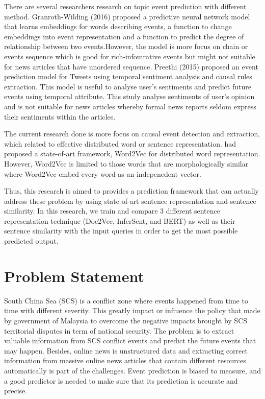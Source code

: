 \documentclass[twoside]{utmthesis}
\begin{document}
There are several researchers research on topic event prediction with different method. Granroth-Wilding (2016) proposed a predictive neural network model that learns embeddings for words describing events, a function to change embeddings into event representation and a function to predict the degree of relationship between two events.However, the model is more focus on chain or events sequence which is good for rich-infomrative events but might not suitable for news articles that have unordered sequence. Preethi (2015) proposed an event prediction model for Tweets using temporal sentiment analysis and causal rules extraction. This model is useful to analyse user's sentiments and predict future events using temporal attribute. This study analyse sentiments of user's opinion and is not suitable for news articles whereby formal news reports seldom express their sentiments within the articles. 

The current research done is more focus on causal event detection and extraction, which related to effective distributed word or sentence representation. \cite{mikolov2013distributed} had proposed a state-of-art framework, Word2Vec for distributed word representation. However, Word2Vec is limited to those words that are morphologically similar where Word2Vec embed every word as an indepenedent vector. 

Thus, this research is aimed to provides a prediction framework that can actually address these problem by using state-of-art sentence representation and sentence similarity. In this research, we train and compare 3 different sentence representation technique (Doc2Vec, InferSent, and BERT) as well as their sentence similarity with the input queries in order to get the most possible predicted output.  


\section{Problem Statement}
South China Sea (SCS) is a conflict zone where events happened from time to time with different severity. This greatly impact or influence the policy that made by government of Malaysia to overcome the negative impacts brought by SCS territorial disputes in term of national security. The problem is to extract valuable information from SCS conflict events and predict the future events that may happen. Besides, online news is unstructured data and extracting correct information from massive online news articles that contain different resources automatically is part of the challenges. Event prediction is biased to measure, and a good predictor is needed to make sure that its prediction is accurate and precise.    
\end{document}
